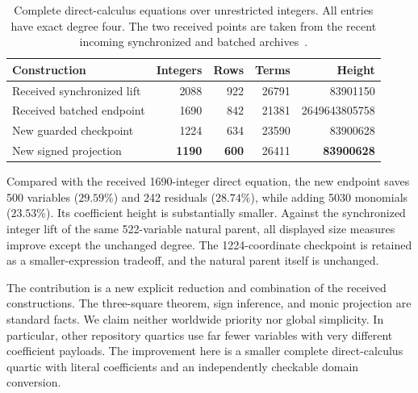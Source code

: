 \begin{table}[ht]
\centering\small
\begin{tabular}{@{}lrrrr@{}}
\toprule
Construction & Integers & Rows & Terms & Height\\
\midrule
Received synchronized lift & 2088 & 922 & 26791 & 83901150\\
Received batched endpoint & 1690 & 842 & 21381 & 2649643805758\\
New guarded checkpoint & 1224 & 634 & 23590 & 83900628\\
New signed projection & \textbf{1190} & \textbf{600} & 26411 & \textbf{83900628}\\
\bottomrule
\end{tabular}
\caption{Complete direct-calculus equations over unrestricted integers.
All entries have exact degree four. The two received points are taken
from the recent incoming synchronized and batched archives~\cite{sync,batched}.}
\label{tab:direct}
\end{table}

Compared with the received 1690-integer direct equation, the new endpoint
saves 500 variables ($29.59\%$) and 242 residuals ($28.74\%$), while
adding 5030 monomials ($23.53\%$). Its coefficient height is substantially
smaller. Against the synchronized integer lift of the same 522-variable
natural parent, all displayed size measures improve except the unchanged
degree. The 1224-coordinate checkpoint is retained as a
smaller-expression tradeoff, and the natural parent itself is unchanged.

The contribution is a new explicit reduction and combination of the
received constructions. The three-square theorem, sign inference, and
monic projection are standard facts. We claim neither worldwide
priority nor global simplicity. In particular, other repository
quartics use far fewer variables with very different coefficient
payloads. The improvement here is a smaller complete direct-calculus
quartic with literal coefficients and an independently checkable domain
conversion.
